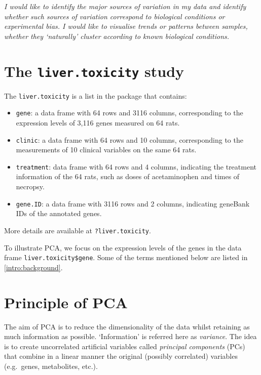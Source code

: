 \documentclass[]{book}
\begin{document}
{
\emph{I would like to identify the major sources of variation in my data and identify whether such sources of variation correspond to biological conditions or experimental bias. I would like to visualise trends or patterns between samples, whether they `naturally' cluster according to known biological conditions.}
}

\hypertarget{the-liver.toxicity-study}{%
\section{\texorpdfstring{The \texttt{liver.toxicity} study}{The liver.toxicity study}}\label{the-liver.toxicity-study}}

The \texttt{liver.toxicity} is a list in the package that contains:

\begin{itemize}
\item
  \texttt{gene}: a data frame with 64 rows and 3116 columns, corresponding to the expression levels of 3,116 genes measured on 64 rats.
\item
  \texttt{clinic}: a data frame with 64 rows and 10 columns, corresponding to the measurements of 10 clinical variables on the same 64 rats.
\item
  \texttt{treatment}: data frame with 64 rows and 4 columns, indicating the treatment information of the 64 rats, such as doses of acetaminophen and times of necropsy.
\item
  \texttt{gene.ID}: a data frame with 3116 rows and 2 columns, indicating geneBank IDs of the annotated genes.
\end{itemize}

More details are available at \texttt{?liver.toxicity}.

To illustrate PCA, we focus on the expression levels of the genes in the data frame \texttt{liver.toxicity\$gene}. Some of the terms mentioned below are listed in \ref{intro:background}.

\hypertarget{principle-of-pca}{%
\section{Principle of PCA}\label{principle-of-pca}}

The aim of PCA \citep{Jol05} is to reduce the dimensionality of the data whilst retaining as much information as possible. `Information' is referred here as \emph{variance}. The idea is to create uncorrelated artificial variables called \emph{principal components} (PCs) that combine in a linear manner the original (possibly correlated) variables (e.g.~genes, metabolites, etc.).
\end{document}
